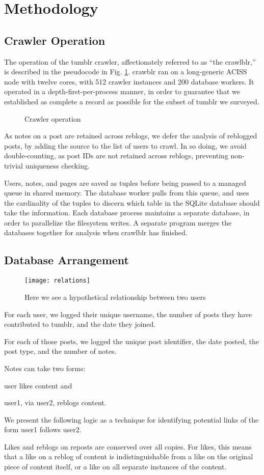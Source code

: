 \section{Methodology}
\label{sec:-method}
\subsection{Crawler Operation}
The operation of the tumblr crawler, affectionately referred to as ``the crawlblr,'' 
is described in the pseudocode in Fig. \ref{crawler}.  crawblr 
ran on a long-generic ACISS node with twelve cores, with 512 crawler 
instances and 200 database workers.  It operated in a 
depth-first-per-process manner, in order to guarantee that we 
established as complete a record as possible for the subset of tumblr 
we surveyed. 
\begin{figure}
  
  \caption{Crawler operation}\label{crawler}
\end{figure}

As notes on a post are retained across reblogs, we defer the analysis 
of reblogged posts, by adding the source to the list of users to crawl.  
In so doing, we avoid double-counting, as post IDs are not retained 
across reblogs, preventing non-trivial uniqueness checking.

Users, notes, and pages are saved as tuples before being passed to a 
managed queue in shared memory.  The database worker pulls from this 
queue, and uses the cardinality of the tuples to discern which table 
in the SQLite database should take the information.  Each database 
process maintains a separate database, in order to parallelize the 
filesystem writes.  A separate program merges the databases together 
for analysis when crawlblr has finished.
\subsection{Database Arrangement}
\begin{figure*}
\centering
\texttt{[image: relations]}
 \caption{Here we see a hypothetical relationship between two users}
 \label{fig:relations}
\end{figure*}

For each user, we logged their unique username, the number of posts 
they have contributed to tumblr, and the date they joined. 

For each of those posts, we logged the unique post identifier, the 
date posted, the post type, and the number of notes.

Notes can take two forms: 

user likes content and 

user1, via user2, reblogs content.

We present the following logic as a technique for identifying potential 
links of the form user1 follows user2.

Likes and reblogs on reposts are conserved over all copies.  For likes, 
this means that a like on a reblog of content is indistinguishable from 
a like on the original piece of content itself, or a like on all 
separate instances of the content.
